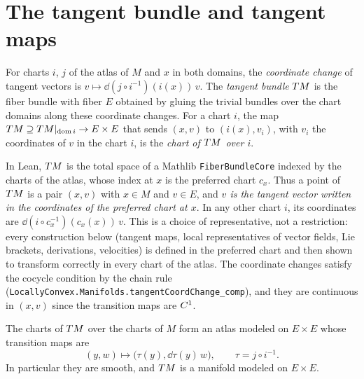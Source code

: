 \section{The tangent bundle and tangent maps}

\begin{definition}
  \label{def:tangent-bundle}
  \leanok
  For charts $i$, $j$ of the atlas of $M$ and $x$ in both domains, the \emph{coordinate change}
  of tangent vectors is $v \mapsto \dd(j \circ i^{-1})(i(x))\,v$. The \emph{tangent bundle}
  $\T M$ is the fiber bundle with fiber $E$ obtained by gluing the trivial bundles over the
  chart domains along these coordinate changes. For a chart $i$, the map
  $T M \supseteq T M|_{\operatorname{dom} i} \to E \times E$ that sends $(x, v)$ to
  $(i(x), v_i)$, with $v_i$ the coordinates of $v$ in the chart $i$, is the \emph{chart of $\T M$
  over $i$}.
\end{definition}

In Lean, $\T M$ is the total space of a Mathlib \texttt{FiberBundleCore} indexed by the charts of
the atlas, whose index at $x$ is the preferred chart $c_x$. Thus a point of $\T M$ is a pair
$(x, v)$ with $x \in M$ and $v \in E$, and \emph{$v$ is the tangent vector written in the
coordinates of the preferred chart at $x$}. In any other chart $i$, its coordinates are
$\dd(i \circ c_x^{-1})(c_x(x))\,v$. This is a choice of representative, not a restriction:
every construction below (tangent maps, local representatives of vector fields, Lie brackets,
derivations, velocities) is defined in the preferred chart and then shown to transform correctly
in every chart of the atlas. The coordinate changes satisfy the cocycle condition by the chain
rule (\texttt{LocallyConvex.Manifolds.tangentCoordChange\_comp}), and they are continuous in $(x, v)$ since
the transition maps are $C^{1}$.

\begin{theorem}[$\T M$ is a manifold]
  \label{thm:man-tangent-manifold}
  \leanok
  The charts of $\T M$ over the charts of $M$ form an atlas modeled on $E \times E$ whose
  transition maps are
  \[
    (y, w) \longmapsto \bigl(\tau(y), \dd\tau(y)\,w\bigr), \qquad \tau = j \circ i^{-1}.
  \]
  In particular they are smooth, and $\T M$ is a manifold modeled on $E \times E$.
\end{theorem}

